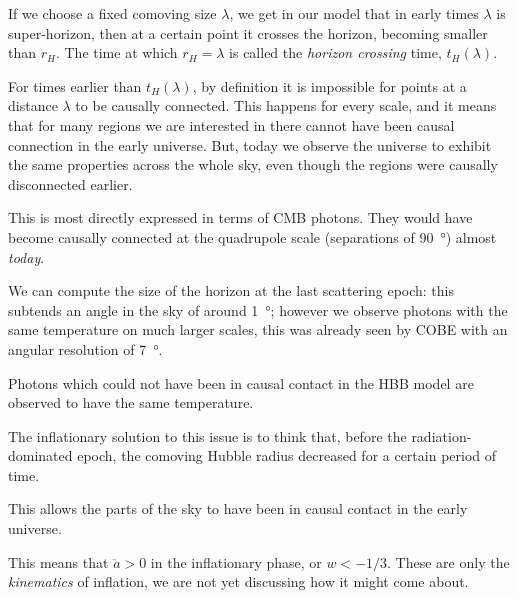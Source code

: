 \documentclass[main.tex]{subfiles}
\begin{document}
If we choose a fixed comoving size \(\lambda \), we get in our model that in early times \(\lambda \) is super-horizon, then at a certain point it crosses the horizon, becoming smaller than \(r_H \). The time at which \(r_H = \lambda \) is called the \emph{horizon crossing} time, \(t_H (\lambda )\). 

For times earlier than \(t_H (\lambda )\), by definition it is impossible for points at a distance \(\lambda \) to be causally connected. 
This happens for every scale, and it means that for many regions we are interested in there cannot have been causal connection in the early universe. 
But, today we observe the universe to exhibit the same properties across the whole sky, even though the regions were causally disconnected earlier. 

This is most directly expressed in terms of CMB photons. They would have become causally connected at the quadrupole scale (separations of \SI{90}{\degree}) almost \emph{today}. 

We can compute the size of the horizon at the last scattering epoch: this subtends an angle in the sky of around \SI{1}{\degree}; however we observe photons with the same temperature on much larger scales, this was already seen by COBE with an angular resolution of \SI{7}{\degree}. 


Photons which could not have been in causal contact in the HBB model are observed to have the same temperature. 

The inflationary solution to this issue is to think that, before the radiation-dominated epoch, the comoving Hubble radius decreased for a certain period of time.

This allows the parts of the sky to have been in causal contact in the early universe. 

This means that \(\ddot{a} > 0\) in the inflationary phase, or \(w < - 1/3\).
These are only the \emph{kinematics} of inflation, we are not yet discussing how it might come about. 
\end{document}
